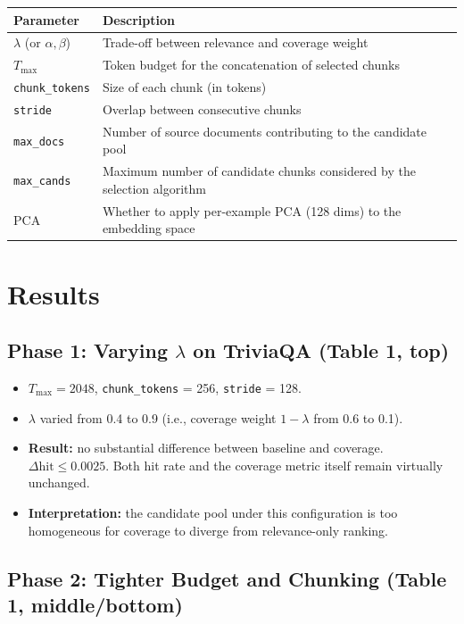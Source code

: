 \documentclass[11pt,a4paper]{article}
\begin{document}
\begin{tabular}{@{}lp{10cm}@{}}
	\toprule
	Parameter & Description \\
	\midrule
	$\lambda$ (or $\alpha, \beta$) & Trade-off between relevance and coverage weight \\
	$T_{\max}$ & Token budget for the concatenation of selected chunks \\
	\texttt{chunk\_tokens} & Size of each chunk (in tokens) \\
	\texttt{stride} & Overlap between consecutive chunks \\
	\texttt{max\_docs} & Number of source documents contributing to the candidate pool \\
	\texttt{max\_cands} & Maximum number of candidate chunks considered by the selection algorithm \\
	PCA & Whether to apply per-example PCA (128 dims) to the embedding space \\
	\bottomrule
\end{tabular}

\section{Results}

\subsection{Phase 1: Varying $\lambda$ on TriviaQA (Table 1, top)}

\begin{itemize}[leftmargin=*]
	\item $T_{\max} = 2048$, \texttt{chunk\_tokens} = 256, \texttt{stride} = 128.
	\item $\lambda$ varied from 0.4 to 0.9 (i.e., coverage weight $1-\lambda$ from 0.6 to 0.1).
	\item \textbf{Result:} no substantial difference between baseline and coverage. $\Delta\text{hit} \leq 0.0025$. Both hit rate and the coverage metric itself remain virtually unchanged.
	\item \textbf{Interpretation:} the candidate pool under this configuration is too homogeneous for coverage to diverge from relevance-only ranking.
\end{itemize}

\subsection{Phase 2: Tighter Budget and Chunking (Table 1, middle/bottom)}
\end{document}
